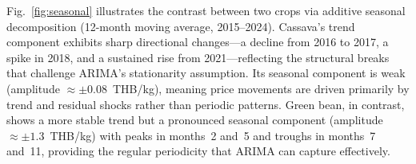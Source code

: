 \documentclass[journal]{IEEEtran}
\begin{document}
Fig.~\ref{fig:seasonal} illustrates the contrast between two crops via additive seasonal decomposition (12-month moving average, 2015--2024). Cassava's trend component exhibits sharp directional changes---a decline from 2016 to 2017, a spike in 2018, and a sustained rise from 2021---reflecting the structural breaks that challenge ARIMA's stationarity assumption. Its seasonal component is weak (amplitude $\approx \pm 0.08$~THB/kg), meaning price movements are driven primarily by trend and residual shocks rather than periodic patterns. Green bean, in contrast, shows a more stable trend but a pronounced seasonal component (amplitude $\approx \pm 1.3$~THB/kg) with peaks in months~2 and~5 and troughs in months~7 and~11, providing the regular periodicity that ARIMA can capture effectively.

\end{document}
